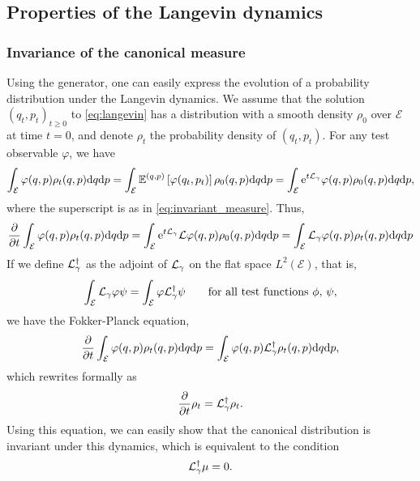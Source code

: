 \subsection{Properties of the Langevin dynamics}

    \subsubsection*{Invariance of the canonical measure}

    Using the generator, one can easily express the evolution of a probability distribution under the Langevin dynamics.
    We assume that the solution $(q_t,p_t)_{t\geq 0}$ to \eqref{eq:langevin} has a distribution with a smooth density $\rho_0$ over $\mathcal E$ at time $t=0$, and denote $\rho_t$ the probability density of $(q_t,p_t)$.
    For any test observable $\varphi$, we have
    $$\int_{\mathcal E}\varphi(q,p)\rho_t(q,p)\mathrm{d} q\mathrm{d} p=\int_{\mathcal E}\mathbb{E}^{(q,p)}\left[\varphi(q_t,p_t)\right]\rho_0(q,p)\mathrm{d} q\mathrm{d} p=\int_{\mathcal E}\mathrm{e}^{t\mathcal{L}_\gamma}\varphi(q,p)\rho_0(q,p)\mathrm{d} q\mathrm{d} p,$$
    where the superscript is as in \eqref{eq:invariant_measure}. Thus,
    $$\frac{\partial}{\partial t}\int_{\mathcal E}\varphi(q,p)\rho_t(q,p)\mathrm{d} q\mathrm{d} p=\int_{\mathcal E}\mathrm{e}^{t\mathcal{L}_\gamma}\mathcal{L}\varphi(q,p)\rho_0(q,p)\mathrm{d} q\mathrm{d} p=\int_{\mathcal E}\mathcal{L}_\gamma\varphi(q,p)\rho_t(q,p)\mathrm{d} q \mathrm{d} p$$
    If we define $\mathcal{L}_\gamma^\dagger$ as the adjoint of $\mathcal{L}_\gamma$ on the flat space $L^2(\mathcal E)$, that is,
    \begin{equation}
        \label{eq:L_dagger}
        \int_{\mathcal E}\mathcal{L}_\gamma\varphi \psi=\int_{\mathcal E}\varphi \mathcal{L}_\gamma^\dagger \psi \qquad\text{for all test functions }\phi,\,\psi,
    \end{equation}
    we have the Fokker-Planck equation,
    \begin{equation}\label{eq:fokker_planck}
        \frac{\partial}{\partial t}\int_{\mathcal E}\varphi(q,p)\rho_t(q,p)\mathrm{d} q\mathrm{d} p=\int_{\mathcal E}\varphi(q,p)\mathcal{L}_\gamma^\dagger\rho_t(q,p)\mathrm{d} q \mathrm{d} p,
    \end{equation}
    which rewrites formally as 
    \begin{equation}
        \label{eq:fokker_planck_formal}
        \frac{\partial}{\partial t}\rho_t=\mathcal{L}_\gamma^\dagger\rho_t.
    \end{equation}
    Using this equation, we can easily show that the canonical distribution is invariant under this dynamics, which is equivalent to the condition 
    $$\mathcal{L}_\gamma^\dagger \mu=0.$$
